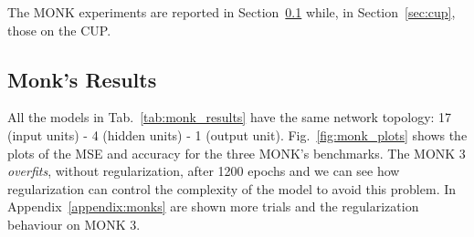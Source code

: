 \documentclass[11pt]{article}
\begin{document}
The MONK experiments are reported in Section~\ref{sec:monks} while, in Section~\ref{sec:cup}, those on the CUP.

\subsection{Monk's Results}
\label{sec:monks}
All the models in Tab.~\ref{tab:monk_results} have the same network topology: 17 (input units) -  4 (hidden units) - 1 (output unit). Fig.~\ref{fig:monk_plots} shows the plots of the MSE and accuracy for the three MONK's benchmarks. The MONK 3 \emph{overfits}, without regularization, after 1200 epochs and we can see how regularization can control the complexity of the model to avoid this problem.
In Appendix~\ref{appendix:monks} are shown more trials and the regularization behaviour on MONK 3.
\end{document}
